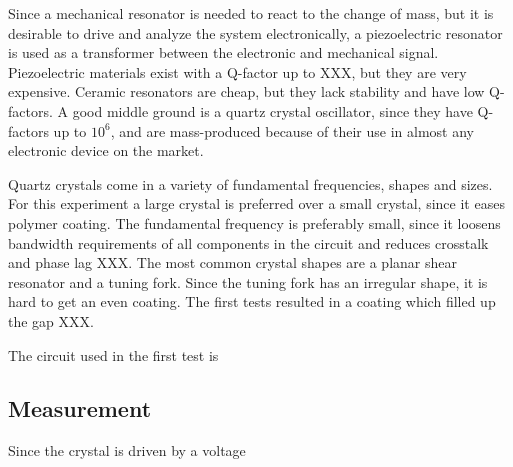 Since a mechanical resonator is needed to react to the change of mass, but it is desirable to drive and analyze the system electronically, a piezoelectric resonator is used as a transformer between the electronic and mechanical signal. Piezoelectric materials exist with a Q-factor up to XXX, but they are very expensive. Ceramic resonators are cheap, but they lack stability and have low Q-factors. A good middle ground is a quartz crystal oscillator, since they have Q-factors up to $10^6$, and are mass-produced because of their use in almost any electronic device on the market. 

Quartz crystals come in a variety of fundamental frequencies, shapes and sizes. For this experiment a large crystal is preferred over a small crystal, since it eases polymer coating. The fundamental frequency is preferably small, since it loosens bandwidth requirements of all components in the circuit and reduces crosstalk and phase lag XXX. The most common crystal shapes are a planar shear resonator and a tuning fork. Since the tuning fork has an irregular shape, it is hard to get an even coating. The first tests resulted in a coating which filled up the gap XXX. 

The circuit used in the first test is 

\subsection{Measurement}
Since the crystal is driven by a voltage 